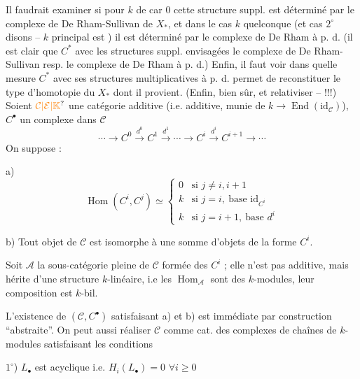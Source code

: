 Il faudrait examiner si pour
$k$ de car 0  cette structure suppl.
est déterminé par le complexe de
De Rham-Sullivan de $X_*$, et dans
le cas $k$ quelconque (et cas $2^\circ$ disons
-- $k$ principal est ) il est
déterminé par le complexe de
De Rham à p. d. 
 (il est clair que $C^*$
avec les structures suppl. envisagées
 le complexe de De Rham-Sullivan resp. le complexe de
De Rham à p. d.) Enfin, il
faut voir dans quelle mesure $C^*$
avec ses structures multiplicatives
à p. d. permet de reconstituer le
type d'homotopie du $X_*$ dont
il provient. (Enfin, bien sûr,
 et relativiser -- !!!)
Soient  $\unsure{\mathcal C|\mathcal E|\mathbb K}$ une catégorie additive (i.e. additive, munie
de $k\to\operatorname{End}(\mathrm{id}_{\mathcal C})$), $C^\bullet$ un complexe  dans
$\mathcal C$
\[
 \cdots\longrightarrow C^0\xrightarrow{d^0}C^1\xrightarrow{d^1}
 \cdots\longrightarrow C^i\xrightarrow{d^i}C^{i+1}\longrightarrow\cdots
\]
On suppose :

a)
\[
\operatorname{Hom}(C^i,C^j)\simeq
\begin{cases}
0&\text{si }j\ne i,i+1\\
k&\text{si }j=i,\ \text{base }\mathrm{id}_{C^i}\\
k&\text{si }j=i+1,\ \text{base }d^i
\end{cases}
\]

b) Tout objet de $\mathcal C$ est isomorphe à une
somme  d'objets de la forme $C^i$.

Soit $\mathcal A$ la sous-catégorie pleine de $\mathcal C$
formée des \deleted{$\unsure{\Phi}$} $C^i$ ; elle n'est pas additive,
mais hérite d'une structure $k$-linéaire,
i.e les $\operatorname{Hom}_{\mathcal A}$ sont des $k$-modules, leur
composition est $k$-bil.

 L'existence de $(\mathcal C,C^\bullet)$ satisfaisant a) et
b) est immédiate par construction ``abstraite''.
On peut aussi réaliser $\mathcal C$ comme  cat.  des
complexes de chaînes  de $k$-modules
satisfaisant les conditions

$1^\circ$)  $L_{\bullet}$ est acyclique i.e. $H_i(L_{\bullet})=0$ $\forall i\geq0$

